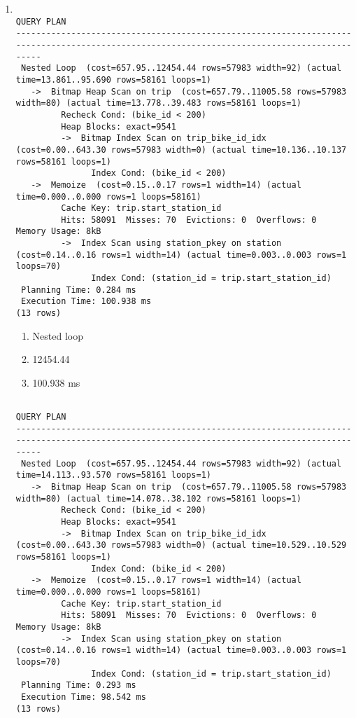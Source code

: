 \documentclass{homework}
\begin{document}
\begin{enumerate}
    \item
    \begin{verbatim}
                                                                QUERY PLAN
-------------------------------------------------------------------------------------------------------------------------------------------
 Nested Loop  (cost=657.95..12454.44 rows=57983 width=92) (actual time=13.861..95.690 rows=58161 loops=1)
   ->  Bitmap Heap Scan on trip  (cost=657.79..11005.58 rows=57983 width=80) (actual time=13.778..39.483 rows=58161 loops=1)
         Recheck Cond: (bike_id < 200)
         Heap Blocks: exact=9541
         ->  Bitmap Index Scan on trip_bike_id_idx  (cost=0.00..643.30 rows=57983 width=0) (actual time=10.136..10.137 rows=58161 loops=1)
               Index Cond: (bike_id < 200)
   ->  Memoize  (cost=0.15..0.17 rows=1 width=14) (actual time=0.000..0.000 rows=1 loops=58161)
         Cache Key: trip.start_station_id
         Hits: 58091  Misses: 70  Evictions: 0  Overflows: 0  Memory Usage: 8kB
         ->  Index Scan using station_pkey on station  (cost=0.14..0.16 rows=1 width=14) (actual time=0.003..0.003 rows=1 loops=70)
               Index Cond: (station_id = trip.start_station_id)
 Planning Time: 0.284 ms
 Execution Time: 100.938 ms
(13 rows)
\end{verbatim}
    
    \begin{enumerate}
        \item Nested loop
        \item 12454.44
        \item 100.938 ms
    \end{enumerate}

    \begin{verbatim}
                                                                QUERY PLAN
-------------------------------------------------------------------------------------------------------------------------------------------
 Nested Loop  (cost=657.95..12454.44 rows=57983 width=92) (actual time=14.113..93.570 rows=58161 loops=1)
   ->  Bitmap Heap Scan on trip  (cost=657.79..11005.58 rows=57983 width=80) (actual time=14.078..38.102 rows=58161 loops=1)
         Recheck Cond: (bike_id < 200)
         Heap Blocks: exact=9541
         ->  Bitmap Index Scan on trip_bike_id_idx  (cost=0.00..643.30 rows=57983 width=0) (actual time=10.529..10.529 rows=58161 loops=1)
               Index Cond: (bike_id < 200)
   ->  Memoize  (cost=0.15..0.17 rows=1 width=14) (actual time=0.000..0.000 rows=1 loops=58161)
         Cache Key: trip.start_station_id
         Hits: 58091  Misses: 70  Evictions: 0  Overflows: 0  Memory Usage: 8kB
         ->  Index Scan using station_pkey on station  (cost=0.14..0.16 rows=1 width=14) (actual time=0.003..0.003 rows=1 loops=70)
               Index Cond: (station_id = trip.start_station_id)
 Planning Time: 0.293 ms
 Execution Time: 98.542 ms
(13 rows)
\end{verbatim}


\end{enumerate}
\end{document}
